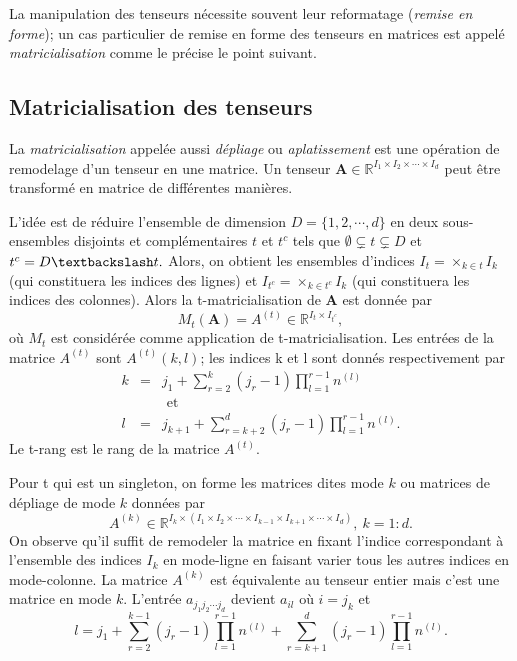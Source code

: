 \documentclass[11pt,a4paper,oneside]{book}
\def\R{\mathbb R}
\begin{document}
La manipulation des tenseurs nécessite souvent leur reformatage (\textit{remise en forme}); un cas particulier de remise en forme des tenseurs en matrices est appelé \textit{matricialisation} comme le précise le point suivant.
\subsection{Matricialisation des tenseurs}
La \textit{matricialisation} appelée aussi \textit{dépliage} ou \textit{aplatissement} est une opération de remodelage d'un tenseur en une matrice. Un tenseur $ \mathbf{A} \in \R^{I_{1}\times I_{2}\times\cdots\times I_{d}} $ peut être transformé en matrice de différentes manières.

L'idée est de réduire l'ensemble de dimension $ D=\{1,2,\cdots,d\} $ en deux sous-ensembles disjoints et complémentaires $ t $ et $ t^{c} $ tels que $ \emptyset\subsetneq t\subsetneq D $ et $ t^{c}=D\textbackslash t .$ Alors, on obtient les ensembles d'indices $ I_{t}=\times_{k\in t}I_{k} $ (qui constituera les indices des lignes) et $ I_{t^{c}}=\times_{k\in t^{c}}I_{k} $ (qui constituera les indices des colonnes). Alors la t-matricialisation de $ \mathbf{A} $ est donnée par 
\begin{equation}\label{matricisation1}
M_{t}(\mathbf{A})=A^{(t)}\in \R^{I_{t}\times I_{t^{c}}},
\end{equation}où $ M_{t} $ est considérée comme application de t-matricialisation. Les entrées de la matrice $ A^{(t)} $ sont $ A^{(t)}(k,l) $; les indices k et l sont donnés respectivement par
\begin{eqnarray}
k&=&j_{1}+\sum_{r=2}^{k}\left(j_{r}-1\right)\prod_{l=1}^{r-1}n^{(l)}\\
&&\text{ et }\nonumber\\
l&=&j_{k+1}+\sum_{r=k+2}^{d}\left(j_{r}-1\right)\prod_{l=1}^{r-1}n^{(l)}.
\end{eqnarray}
Le t-rang est le rang de la matrice $ A^{(t)} $.

Pour t qui est un singleton, on forme les matrices dites mode $ k $ ou matrices de dépliage de mode $ k $ données par
\begin{equation}\label{(2.15)}
	A^{(k)}\in \R^{I_{k}\times (I_{1}\times I_{2}\times \cdots\times I_{k-1}\times I_{k+1}\times\cdots\times I_{d})},\: k=1:d.
\end{equation}
On observe qu'il suffit de remodeler la matrice en fixant l'indice correspondant à l'ensemble des indices $ I_{k} $ en mode-ligne en faisant varier tous les autres indices en mode-colonne. La matrice $ A^{(k)} $ est équivalente au tenseur entier mais c'est une matrice en mode $ k $. L'entrée $ a_{j_{1}j_{2}\cdots j_{d}} $ devient $ a_{il} $ où $ i=j_{k} $ et 
\begin{equation}
l=j_{1}+\sum_{r=2}^{k-1}\left(j_{r}-1\right)\prod_{l=1}^{r-1}n^{(l)}+\sum_{r=k+1}^{d}\left(j_{r}-1\right)\prod_{l=1}^{r-1}n^{(l)}.
\end{equation}
\end{document}
